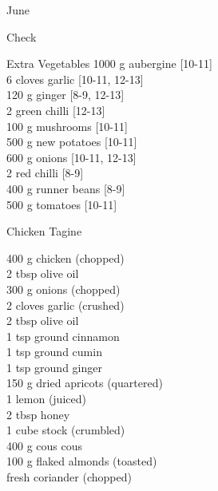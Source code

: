 \begin{menu}{June}
\begin{shoppinglist}{Check}
      \end{shoppinglist}%
      \begin{shoppinglist}{Extra Vegetables}
      1000 g aubergine {\scriptsize[10-11]}\\
      6 cloves garlic {\scriptsize[10-11, 12-13]}\\
      120 g ginger {\scriptsize[8-9, 12-13]}\\
      2  green chilli {\scriptsize[12-13]}\\
      100 g mushrooms {\scriptsize[10-11]}\\
      500 g new potatoes {\scriptsize[10-11]}\\
      600 g onions {\scriptsize[10-11, 12-13]}\\
      2  red chilli {\scriptsize[8-9]}\\
      400 g runner beans {\scriptsize[8-9]}\\
      500 g tomatoes {\scriptsize[10-11]}\\
      \end{shoppinglist}%
      \par\vfil %
    \vfil\clearpage
  
    \begin{recipe}{2}{Chicken Tagine}%
		\begin{ingredients}
		400 g chicken (chopped) \\
	2 tbsp olive oil  \\
	300 g onions (chopped) \\
	2 cloves garlic (crushed) \\
	2 tbsp olive oil  \\
	1 tsp ground cinnamon  \\
	1 tsp ground cumin  \\
	1 tsp ground ginger  \\
	150 g dried apricots (quartered) \\
	1  lemon (juiced) \\
	2 tbsp honey  \\
	1 cube stock (crumbled) \\
	400 g cous cous  \\
	100 g flaked almonds (toasted) \\
	  fresh coriander (chopped) \\
	
		\end{ingredients}
	

\end{recipe}
\end{menu}
